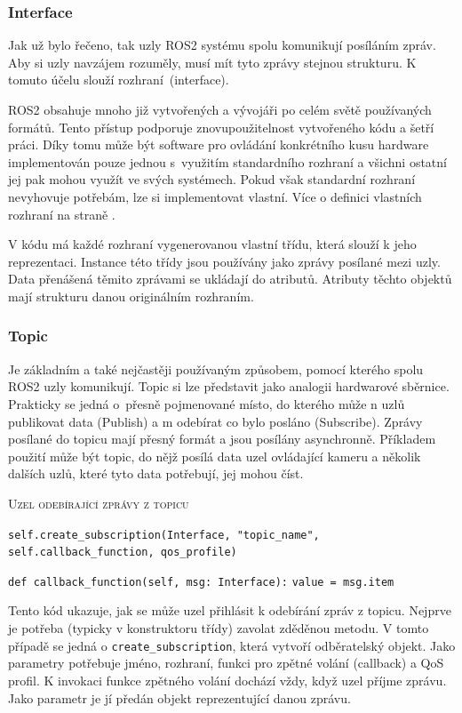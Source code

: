 \newpage
\subsubsection*{Interface}
Jak už bylo řečeno, tak uzly ROS2 systému spolu komunikují posíláním zpráv. Aby si uzly navzájem rozuměly, musí mít tyto zprávy stejnou strukturu. K tomuto účelu slouží rozhraní~(interface). 

ROS2 obsahuje mnoho již vytvořených a vývojáři po celém světě používaných formátů. Tento přístup podporuje znovupoužitelnost vytvořeného kódu a šetří práci. Díky tomu může být software pro ovládání konkrétního kusu hardware implementován pouze jednou s~využitím standardního rozhraní a všichni ostatní jej pak mohou využít ve svých systémech. Pokud však standardní rozhraní nevyhovuje potřebám, lze si implementovat vlastní.\cite{ros2_documentation} Více o definici vlastních rozhraní na straně \pageref{theory:custom_interfaces}.

V kódu má každé rozhraní vygenerovanou vlastní třídu, která slouží k jeho reprezentaci. Instance této třídy jsou používány jako zprávy posílané mezi uzly. Data přenášená těmito zprávami se ukládají do atributů. Atributy těchto objektů mají strukturu danou originálním rozhraním.

\subsubsection*{Topic}
Je základním a také nejčastěji používaným způsobem, pomocí kterého spolu ROS2 uzly komunikují. Topic si lze představit jako analogii hardwarové sběrnice. Prakticky se jedná o~přesně pojmenované místo, do kterého může n uzlů publikovat data (Publish) a m odebírat co bylo posláno (Subscribe). Zprávy posílané do topicu mají přesný formát a jsou posílány asynchronně. Příkladem použití může být topic, do nějž posílá data uzel ovládající kameru a několik dalších uzlů, které tyto data potřebují, jej mohou číst. \cite[str:~6]{ros2_introduction}

\begin{algorithm}[h!]
	\label{}
	\caption{\textsc{Uzel odebírající zprávy z topicu}}
	
	\DontPrintSemicolon
	\SetAlgoNoLine
	\SetNlSty{}{}{:}
	\SetNlSkip{-1.1em}
	
	\BlankLine \Indp\Indpp
	\texttt{self.create\_subscription(Interface, "topic\_name", self.callback\_function, qos\_profile)}\;
	
	\BlankLine
	\texttt{def callback\_function(self, msg: Interface):}\;
	\Indp\Indp
	\texttt{value = msg.item}\;
\end{algorithm}
Tento kód ukazuje, jak se může uzel přihlásit k odebírání zpráv z topicu. Nejprve je potřeba (typicky v konstruktoru třídy) zavolat zděděnou metodu. V tomto případě se jedná o \verb|create_subscription|, která vytvoří odběratelský objekt. Jako parametry potřebuje jméno, rozhraní, funkci pro zpětné volání (callback) a QoS profil. K invokaci funkce zpětného volání dochází vždy, když uzel příjme zprávu. Jako parametr je jí předán objekt reprezentující danou zprávu. \cite{ros2_documentation}

